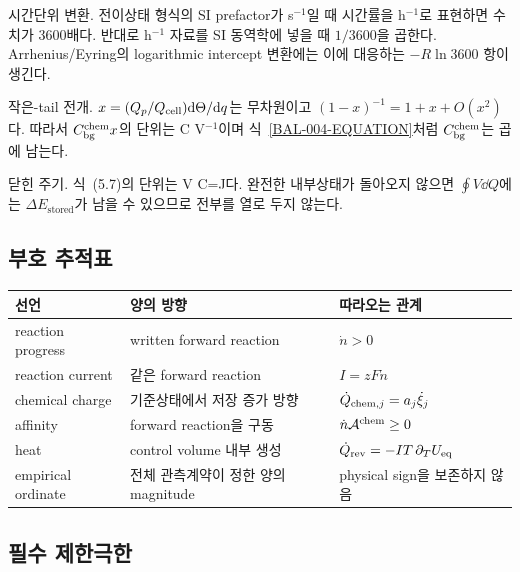\begin{derivationcheck}
 시간단위 변환.
전이상태 형식의 SI prefactor가 s$^{-1}$일 때 시간률을 h$^{-1}$로
표현하면 수치가 3600배다. 반대로 h$^{-1}$ 자료를 SI 동역학에
넣을 때 $1/3600$을 곱한다. Arrhenius/Eyring의 logarithmic
intercept 변환에는 이에 대응하는 $-\!R\ln3600$ 항이 생긴다.
\end{derivationcheck}

\begin{derivationcheck}
 작은-tail 전개.
$x=(Q_p/Q_{\mathrm{cell}})\mathrm d\Theta/\mathrm d q$는 무차원이고
$(1-x)^{-1}=1+x+O(x^2)$다. 따라서
$C_{\mathrm{bg}}^{\mathrm{chem}} x$의 단위는 C V$^{-1}$이며
식~\eqref{BAL-004-EQUATION}처럼 $C_{\mathrm{bg}}^{\mathrm{chem}}$는 곱에 남는다.
\end{derivationcheck}

\begin{derivationcheck}
 닫힌 주기.
식~(5.7)의 단위는 V C=J다. 완전한 내부상태가 돌아오지 않으면
$\oint V\dd Q$에는 $\Delta E_\mathrm{stored}$가 남을 수 있으므로
전부를 열로 두지 않는다.
\end{derivationcheck}

\subsection{부호 추적표}

\begin{center}
\begin{tabularx}{\textwidth}{p{}p{}X}
\toprule
선언 & 양의 방향 & 따라오는 관계\\
\midrule
reaction progress & written forward reaction & $\dot n>0$\\
reaction current & 같은 forward reaction & $I=zF\dot n$\\
chemical charge & 기준상태에서 저장 증가 방향 & $\dot Q_{\mathrm{chem},j}=a_j\dot\xi_j$\\
affinity & forward reaction을 구동 & $\dot n\mathcal A^{\mathrm{chem}}\ge0$\\
heat & control volume 내부 생성 & $\dot Q_{\mathrm{rev}}=-IT\,\partial_TU_{\mathrm{eq}}$\\
empirical ordinate & 전체 관측계약이 정한 양의 magnitude & physical sign을 보존하지 않음\\
\bottomrule
\end{tabularx}
\end{center}

\subsection{필수 제한극한}

